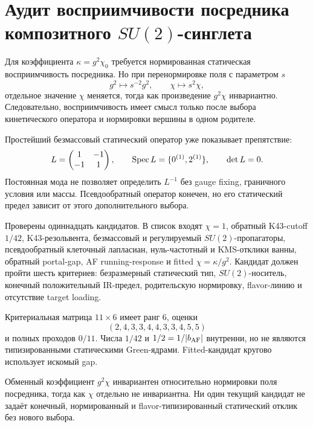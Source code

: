 \chapter{Аудит восприимчивости посредника композитного
\texorpdfstring{$SU(2)$}{SU(2)}-синглета}
\label{ch:v10-discrete-resolution-su2-singlet-mediator-susceptibility}

Для коэффициента $\kappa=g^2\chi_0$ требуется нормированная статическая
восприимчивость посредника. Но при перенормировке поля с параметром $s$
\begin{equation}
 g^2\longmapsto s^{-2}g^2,
 \qquad \chi\longmapsto s^2\chi,
\end{equation}
отдельное значение $\chi$ меняется, тогда как произведение $g^2\chi$
инвариантно. Следовательно, восприимчивость имеет смысл только после выбора
кинетического оператора и нормировки вершины в одном родителе.

Простейший безмассовый статический оператор уже показывает препятствие:
\begin{equation}
 L=\begin{pmatrix}1&-1\\-1&1\end{pmatrix},
 \qquad \operatorname{Spec} L=\{0^{(1)},2^{(1)}\},\qquad \det L=0.
\end{equation}
Постоянная мода не позволяет определить $L^{-1}$ без gauge fixing,
граничного условия или массы. Псевдообратный оператор конечен, но его
статический предел зависит от этого дополнительного выбора.

Проверены одиннадцать кандидатов. В список входят $\chi=1$, обратный
K43-cutoff $1/42$, K43-резольвента, безмассовый и регулируемый
$SU(2)$-пропагаторы, псевдообратный клеточный лапласиан, нуль-частотный и
KMS-отклики ванны, обратный portal-gap, AF running-response и fitted
$\chi=\kappa/g^2$. Кандидат должен пройти шесть критериев: безразмерный
статический тип, $SU(2)$-носитель, конечный положительный IR-предел,
родительскую нормировку, flavor-линию и отсутствие target loading.

Критериальная матрица $11\times6$ имеет ранг $6$, оценки
\begin{equation}
 (2,4,3,3,4,4,3,3,4,5,5)
\end{equation}
и полных проходов $0/11$. Числа $1/42$ и $1/2=1/|b_{\rm AF}|$ внутренни,
но не являются типизированными статическими Green-ядрами. Fitted-кандидат
кругово использует искомый gap.

\begin{theorem}
Обменный коэффициент $g^2\chi$ инвариантен относительно нормировки поля
посредника, тогда как $\chi$ отдельно не инвариантна. Ни один текущий
кандидат не задаёт конечный, нормированный и flavor-типизированный
статический отклик без нового выбора.
\end{theorem}

